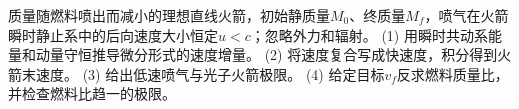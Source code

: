 质量随燃料喷出而减小的理想直线火箭，初始静质量\(M_0\)、终质量\(M_f\)，喷气在火箭瞬时静止系中的后向速度大小恒定\(u<c\)；忽略外力和辐射。
(1) 用瞬时共动系能量和动量守恒推导微分形式的速度增量。
(2) 将速度复合写成快速度，积分得到火箭末速度。
(3) 给出低速喷气与光子火箭极限。
(4) 给定目标\(v_f\)反求燃料质量比，并检查燃料比趋一的极限。
